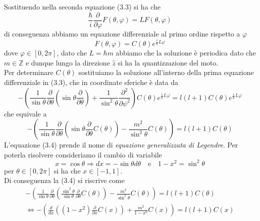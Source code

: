 Sostituendo nella seconda equazione (3.3) si ha che 
\begin{equation*}
	\frac{\hbar}{i} \frac{\partial}{\partial \varphi} F(\theta,\varphi) = L F(\theta,\varphi)
\end{equation*}
di conseguenza abbiamo un equazione differenziale al primo ordine rispetto a $\varphi$
\begin{equation*}
	F(\theta,\varphi) = C(\theta) e^{\frac{i}{\hbar}L \varphi}
\end{equation*}
dove $\varphi \in [0,2\pi]$, dato che $L = \hbar m$ abbiamo che la soluzione \`e periodica dato che $m \in \mathbb{Z}$ e dunque lungo la direzione $\hat{z}$ si ha la quantizzazione del moto.
\\
Per determinare $C(\theta)$ sostituiamo la soluzione all'interno della prima equazione differenziale in (3.3), che in coordinate sferiche \`e data da
\begin{equation*}
	-\left ( \frac{1}{\sin \theta} \frac{\partial}{\partial \theta} \left ( \sin \theta \frac{\partial}{\partial \theta}\right) + \frac{1}{\sin^2 \theta} \frac{\partial ^2}{\partial \psi^2}\right)C(\theta) e^{\frac{i}{\hbar}L \varphi} = l(l+1)C(\theta) e^{\frac{i}{\hbar}L \varphi}
\end{equation*}
che equivale a 
\begin{equation}
		-\left ( \frac{1}{\sin \theta} \frac{\partial}{\partial \theta} \left ( \sin \theta \frac{\partial}{\partial \theta}C(\theta)\right) - \frac{m^2}{\sin^2 \theta} C(\theta)\right) = l(l+1)C(\theta) 
\end{equation}
L'equazione (3.4) prende il nome di \textit{equazione generalizzata di Legendre}. Per poterla risolvere consideriamo il cambio di variabile 
\begin{equation*}
	x = \cos \theta \Rightarrow dx = -\sin \theta d\theta  \quad \text{e} \quad 1-x^2 = \sin^2\theta
\end{equation*}
per $\theta \in [0,2 \pi]$ si ha che $x \in [-1,1]$.
\\
Di conseguenza la (3.4) si riscrive come
\begin{equation*}
	\begin{aligned}
			& -\left ( \frac{1}{\sin \theta} \frac{\partial}{\partial \theta} \left ( \frac{\sin^2 \theta}{\sin \theta} \frac{\partial}{\partial \theta}C(\theta)\right) - \frac{m^2}{\sin^2 \theta} C(\theta)\right) = l(l+1)C(\theta) & \\[0.5cm]
			& \iff- \left ( \frac{d}{dx} \left( (1-x^2)\frac{\partial}{\partial x}C(x) \right) + \frac{m^2}{1-x^2}C(x)\right) = l(l+1)C(x)
	\end{aligned}
\end{equation*}
